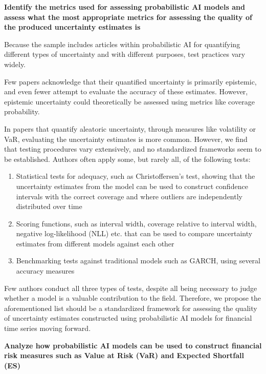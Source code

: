 \textbf{Identify the metrics used for assessing probabilistic AI models and assess what the most appropriate metrics for assessing the quality of the produced uncertainty estimates is}\nopagebreak

Because the sample includes articles within probabilistic AI for quantifying different types of uncertainty and with different purposes, test practices vary widely.

Few papers acknowledge that their quantified uncertainty is primarily epistemic, and even fewer attempt to evaluate the accuracy of these estimates. However, epistemic uncertainty could theoretically be assessed using metrics like coverage probability.

In papers that quantify aleatoric uncertainty, through measures like volatility or VaR, evaluating the uncertainty estimates is more common. However, we find that testing procedures vary extensively, and no standardized frameworks seem to be established. Authors often apply some, but rarely all, of the following tests:

\begin{enumerate}
    \item Statistical tests for adequacy, such as Christoffersen's test, showing that the uncertainty estimates from the model can be used to construct confidence intervals with the correct coverage and where outliers are independently distributed over time
    \item Scoring functions, such as interval width, coverage relative to interval width, negative log-likelihood (NLL) etc. that can be used to compare uncertainty estimates from different models against each other
    \item Benchmarking tests against traditional models such as GARCH, using several accuracy measures
\end{enumerate}

Few authors conduct all three types of tests, despite all being necessary to judge whether a model is a valuable contribution to the field. Therefore, we propose the aforementioned list should be a standardized framework for assessing the quality of uncertainty estimates constructed using probabilistic AI models for financial time series moving forward. 

\textbf{Analyze how probabilistic AI models can be used to construct financial risk measures such as Value at Risk (VaR) and Expected Shortfall (ES)}\nopagebreak

